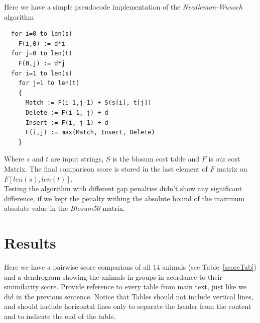 \documentclass[a4paper,11pt]{article}
\begin{document}
Here we have a simple pseudocode implementation of the \textit{Needleman-Wunsch} algorithm

\begin{lstlisting}
  for i=0 to len(s)
    F(i,0) := d*i
  for j=0 to len(t)
    F(0,j) := d*j
  for i=1 to len(s)
    for j=1 to len(t)
    {
      Match := F(i-1,j-1) + S(s[i], t[j])
      Delete := F(i-1, j) + d
      Insert := F(i, j-1) + d
      F(i,j) := max(Match, Insert, Delete)
    }
\end{lstlisting}
Where $s$ and $t$ are input strings, $S$ is the blosum cost table and $F$ is our cost Matrix. The final comparison score is stored in the last element of $F$ matrix on $F[len(s),len(t)]$.\\

Testing the algorithm with different gap penalties didn't show any significant difference, if we kept the penalty withing the absolute bound of the maximum absolute value in the \textit{Blosum50} matrix. 


\section{Results}

Here we have a pairwise score comparions of all 14 animals (see Table~\ref{scoreTab}) and a dendrogram showing the animals in groups in acordance to their smimilarity score. Provide reference to every table from main text, just like we did in the previous sentence. Notice that Tables should not include vertical lines, and should include horizontal lines only to separate the header from the content and to indicate the end of the table.
\end{document}
